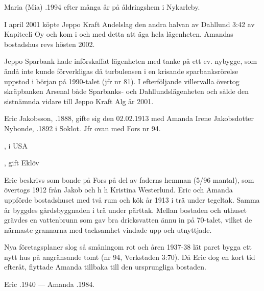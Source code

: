 Maria (Mia) .1994 efter många år på åldringshem i Nykarleby.






I april 2001 köpte Jeppo Kraft Andelslag den andra halvan av Dahllund 3:42 av Kapiteeli Oy och kom i och med detta att äga hela lägenheten. Amandas bostadshus revs hösten 2002.


Jeppo Sparbank hade införskaffat lägenheten med tanke på ett ev. nybygge, som ändå inte kunde förverkligas då turbulensen i en krisande sparbanksrörelse uppstod i början på 1990-talet (jfr nr 81). I efterföljande villervalla övertog skräpbanken Arsenal både Sparbanks- och Dahllundslägenheten och sålde den sistnämnda vidare till Jeppo Kraft Alg år 2001.


\jhvspace{}


Eric Jakobsson, .1888, gifte sig den 02.02.1913 med Amanda Irene Jakobsdotter Nybonde, .1892 i Soklot. Jfr ovan med Fors nr 94.
\begin{jhchildren}
  \item {}, i USA
  \item {}
  \item {}, gift Eklöv
\end{jhchildren}

Eric beskrivs som bonde på Fors på del av faderns hemman (5/96 mantal), som övertogs 1912 från Jakob och h h Kristina Westerlund. Eric och Amanda uppförde bostadshuset med två rum och kök år 1913 i trä under tegeltak. Samma år byggdes gårdsbyggnaden i trä under pärttak. Mellan bostaden och uthuset grävdes en vattenbrunn som gav bra dricksvatten ännu in på 70-talet, vilket de närmaste grannarna med tacksamhet vindade upp och utnyttjade.

Nya företagsplaner slog så småningom rot och åren 1937-38 lät paret bygga ett nytt hus på angränsande tomt (nr 94, Verkstaden 3:70). Då Eric dog en kort tid efteråt, flyttade Amanda tillbaka till den ursprungliga bostaden.

Eric .1940  ---  Amanda .1984.


